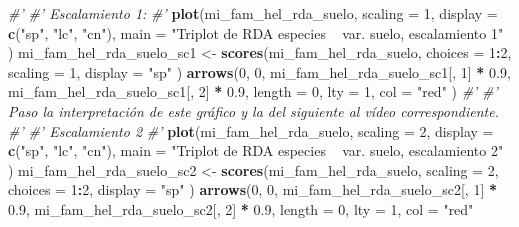 \documentclass[11pt,]{article}
\newenvironment{Shaded}{\begin{snugshade}}{\end{snugshade}}
\newcommand{\KeywordTok}[1]{\textcolor[rgb]{0.13,0.29,0.53}{\textbf{#1}}}
\newcommand{\DataTypeTok}[1]{\textcolor[rgb]{0.13,0.29,0.53}{#1}}
\newcommand{\DecValTok}[1]{\textcolor[rgb]{0.00,0.00,0.81}{#1}}
\newcommand{\FloatTok}[1]{\textcolor[rgb]{0.00,0.00,0.81}{#1}}
\newcommand{\StringTok}[1]{\textcolor[rgb]{0.31,0.60,0.02}{#1}}
\newcommand{\CommentTok}[1]{\textcolor[rgb]{0.56,0.35,0.01}{\textit{#1}}}
\newcommand{\OperatorTok}[1]{\textcolor[rgb]{0.81,0.36,0.00}{\textbf{#1}}}
\newcommand{\NormalTok}[1]{#1}
\begin{document}
\begin{Shaded}
\begin{Highlighting}[]
{{{{{\CommentTok{#' }
\CommentTok{#' Escalamiento 1:}
\CommentTok{#' }
\KeywordTok{plot}\NormalTok{(mi_fam_hel_rda_suelo,}
     \DataTypeTok{scaling =} \DecValTok{1}\NormalTok{,}
     \DataTypeTok{display =} \KeywordTok{c}\NormalTok{(}\StringTok{"sp"}\NormalTok{, }\StringTok{"lc"}\NormalTok{, }\StringTok{"cn"}\NormalTok{),}
     \DataTypeTok{main =} \StringTok{"Triplot de RDA especies ~ var. suelo, escalamiento 1"}
\NormalTok{)}
\NormalTok{mi_fam_hel_rda_suelo_sc1 <-}
\StringTok{  }\KeywordTok{scores}\NormalTok{(mi_fam_hel_rda_suelo,}
         \DataTypeTok{choices =} \DecValTok{1}\OperatorTok{:}\DecValTok{2}\NormalTok{,}
         \DataTypeTok{scaling =} \DecValTok{1}\NormalTok{,}
         \DataTypeTok{display =} \StringTok{"sp"}
\NormalTok{  )}
\KeywordTok{arrows}\NormalTok{(}\DecValTok{0}\NormalTok{, }\DecValTok{0}\NormalTok{,}
\NormalTok{       mi_fam_hel_rda_suelo_sc1[, }\DecValTok{1}\NormalTok{] }\OperatorTok{*}\StringTok{ }\FloatTok{0.9}\NormalTok{,}
\NormalTok{       mi_fam_hel_rda_suelo_sc1[, }\DecValTok{2}\NormalTok{] }\OperatorTok{*}\StringTok{ }\FloatTok{0.9}\NormalTok{,}
       \DataTypeTok{length =} \DecValTok{0}\NormalTok{,}
       \DataTypeTok{lty =} \DecValTok{1}\NormalTok{,}
       \DataTypeTok{col =} \StringTok{"red"}
\NormalTok{)}
\CommentTok{#' }
\CommentTok{#' Paso la interpretación de este gráfico y la del siguiente al vídeo correspondiente.}
\CommentTok{#' }
\CommentTok{#' Escalamiento 2}
\CommentTok{#' }
\KeywordTok{plot}\NormalTok{(mi_fam_hel_rda_suelo,}
     \DataTypeTok{scaling =} \DecValTok{2}\NormalTok{,}
     \DataTypeTok{display =} \KeywordTok{c}\NormalTok{(}\StringTok{"sp"}\NormalTok{, }\StringTok{"lc"}\NormalTok{, }\StringTok{"cn"}\NormalTok{),}
     \DataTypeTok{main =} \StringTok{"Triplot de RDA especies ~ var. suelo, escalamiento 2"}
\NormalTok{)}
\NormalTok{mi_fam_hel_rda_suelo_sc2 <-}
\StringTok{  }\KeywordTok{scores}\NormalTok{(mi_fam_hel_rda_suelo,}
         \DataTypeTok{scaling =} \DecValTok{2}\NormalTok{,}
         \DataTypeTok{choices =} \DecValTok{1}\OperatorTok{:}\DecValTok{2}\NormalTok{,}
         \DataTypeTok{display =} \StringTok{"sp"}
\NormalTok{  )}
\KeywordTok{arrows}\NormalTok{(}\DecValTok{0}\NormalTok{, }\DecValTok{0}\NormalTok{,}
\NormalTok{       mi_fam_hel_rda_suelo_sc2[, }\DecValTok{1}\NormalTok{] }\OperatorTok{*}\StringTok{ }\FloatTok{0.9}\NormalTok{,}
\NormalTok{       mi_fam_hel_rda_suelo_sc2[, }\DecValTok{2}\NormalTok{] }\OperatorTok{*}\StringTok{ }\FloatTok{0.9}\NormalTok{,}
       \DataTypeTok{length =} \DecValTok{0}\NormalTok{,}
       \DataTypeTok{lty =} \DecValTok{1}\NormalTok{,}
       \DataTypeTok{col =} \StringTok{"red"}
}}}}}
\end{Highlighting}
\end{Shaded}
\end{document}
